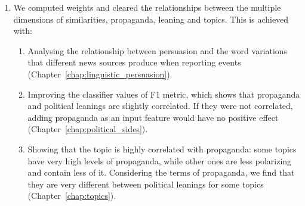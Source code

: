 \begin{enumerate}
    \item We computed weights and cleared the relationships between the multiple dimensions of similarities, propaganda, leaning and topics. This is achieved with:
    \begin{enumerate}
        \item Analysing the relationship between persuasion and the word variations that different news sources produce when reporting events (Chapter~\ref{chap:linguistic_persuasion}).
        \item Improving the classifier values of F1 metric, which shows that propaganda and political leanings are slightly correlated. If they were not correlated, adding propaganda as an input feature would have no positive effect (Chapter~\ref{chap:political_sides}).
        \item Showing that the topic is highly correlated with propaganda: some topics have very high levels of propaganda, while other ones are less polarizing and contain less of it. Considering the terms of propaganda, we find that they are very different between political leanings for some topics (Chapter~\ref{chap:topics}). %
        

\end{enumerate}
\end{enumerate}
